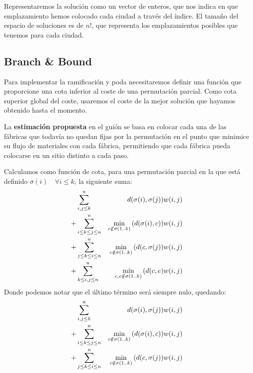 \documentclass[a4paper, 11pt]{article} %
\begin{document}
      Representaremos la solución como un vector de enteros, que nos indica en que emplazamiento hemos colocado cada ciudad a 
      través del índice. El tamaño del espacio de soluciones es de $n!$, que representa los emplazamientos posibles que tenemos 
      para cada ciudad. 
    
    \subsection{Branch \& Bound}
      Para implementar la ramificación y poda necesitaremos definir una función que proporcione una
      cota inferior al coste de una permutación parcial. Como cota superior global del coste, usaremos el
      coste de la mejor solución que hayamos obtenido hasta el momento.
      
      La \textbf{estimación propuesta} en el guión se basa en colocar cada una de las fábricas que todavía no
      quedan fijas por la permutación en el punto que minimice su flujo de materiales con cada fábrica,
      permitiendo que cada fábrica pueda colocarse en un sitio distinto a cada paso.
      
      Calculamos como función de cota, para una permutación parcial en la que está definido $\sigma(i) \quad \forall i \leq k$,
      la siguiente suma:
      \begin{eqnarray*}
      \displaystyle
	  & \sum_{i,j \leq k}^n & d(\sigma(i),\sigma(j)) w(i,j) \\
	+ & \sum_{i \leq k \leq j \leq n}^n & \min_{c \notin \sigma(1..k)}{(d(\sigma(i),c))} w(i,j) \\
	+ & \sum_{j \leq k \leq i \leq n}^n & \min_{c \notin \sigma(1..k)}{(d(c,\sigma(j))} w(i,j) \\
	+ & \sum_{k \leq i,j \leq n}^n& \min_{c,e \notin \sigma(1..k)}{(d(c,e)} w(i,j) \\
      \end{eqnarray*}
      Donde podemos notar que el último término será siempre nulo, quedando:
      \begin{eqnarray*}
      \displaystyle
	  & \sum_{i,j \leq k}^n & d(\sigma(i),\sigma(j)) w(i,j) \\
	+ & \sum_{i \leq k \leq j \leq n}^n & \min_{c \notin \sigma(1..k)}{(d(\sigma(i),c))} w(i,j) \\
	+ & \sum_{j \leq k \leq i \leq n}^n & \min_{c \notin \sigma(1..k)}{(d(c,\sigma(j))} w(i,j) \\
      \end{eqnarray*}
      \medskip
      
\end{document}
